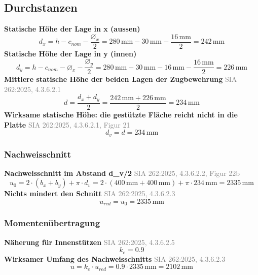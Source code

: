 \documentclass[11pt,a4paper]{article}
\newcommand{\normref}[1]{{\small\textcolor{gray}{#1}}}
\begin{document}
\subsection{Durchstanzen}
\noindent\textbf{Statische Höhe der Lage in x (aussen)}
\begin{equation*}
d_x = h - c_{nom} - \frac{\varnothing_x}{2} = 280\,\mathrm{mm} - 30\,\mathrm{mm} - \frac{16\,\mathrm{mm}}{2} = 242\,\mathrm{mm}
\end{equation*}
\noindent\textbf{Statische Höhe der Lage in y (innen)}
\begin{equation*}
d_y = h - c_{nom} - \varnothing_x - \frac{\varnothing_y}{2} = 280\,\mathrm{mm} - 30\,\mathrm{mm} - 16\,\mathrm{mm} - \frac{16\,\mathrm{mm}}{2} = 226\,\mathrm{mm}
\end{equation*}
\noindent\textbf{Mittlere statische Höhe der beiden Lagen der Zugbewehrung} \hfill \normref{SIA 262:2025, 4.3.6.2.1}
\begin{equation*}
d = \frac{d_x + d_y}{2} = \frac{242\,\mathrm{mm} + 226\,\mathrm{mm}}{2} = 234\,\mathrm{mm}
\end{equation*}
\noindent\textbf{Wirksame statische Höhe: die gestützte Fläche reicht nicht in die Platte} \hfill \normref{SIA 262:2025, 4.3.6.2.1, Figur 21}
\begin{equation*}
d_v = d = 234\,\mathrm{mm}
\end{equation*}
\subsubsection{Nachweisschnitt}
\noindent\textbf{Nachweisschnitt im Abstand d\_v/2} \hfill \normref{SIA 262:2025, 4.3.6.2.2, Figur 22b}
\begin{equation*}
u_0 = 2 \cdot \left(b_x + b_y\right) + \pi \cdot d_v = 2 \cdot \left(400\,\mathrm{mm} + 400\,\mathrm{mm}\right) + \pi \cdot 234\,\mathrm{mm} = 2335\,\mathrm{mm}
\end{equation*}
\noindent\textbf{Nichts mindert den Schnitt} \hfill \normref{SIA 262:2025, 4.3.6.2.3}
\begin{equation*}
u_{red} = u_0 = 2335\,\mathrm{mm}
\end{equation*}
\subsubsection{Momentenübertragung}
\noindent\textbf{Näherung für Innenstützen} \hfill \normref{SIA 262:2025, 4.3.6.2.5}
\begin{equation*}
k_e = 0.9
\end{equation*}
\noindent\textbf{Wirksamer Umfang des Nachweisschnitts} \hfill \normref{SIA 262:2025, 4.3.6.2.3}
\begin{equation*}
u = k_e \cdot u_{red} = 0.9 \cdot 2335\,\mathrm{mm} = 2102\,\mathrm{mm}
\end{equation*}
\end{document}
